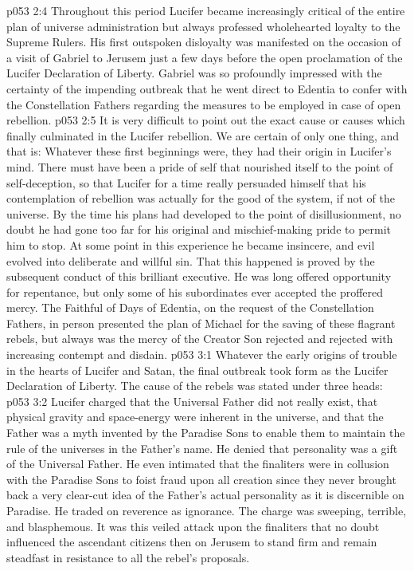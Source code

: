\vs p053 2:4 Throughout this period Lucifer became increasingly critical of the entire plan of universe administration but always professed wholehearted loyalty to the Supreme Rulers. His first outspoken disloyalty was manifested on the occasion of a visit of Gabriel to Jerusem just a few days before the open proclamation of the Lucifer Declaration of Liberty. Gabriel was so profoundly impressed with the certainty of the impending outbreak that he went direct to Edentia to confer with the Constellation Fathers regarding the measures to be employed in case of open rebellion.
\vs p053 2:5 It is very difficult to point out the exact cause or causes which finally culminated in the Lucifer rebellion. We are certain of only one thing, and that is: Whatever these first beginnings were, they had their origin in Lucifer’s mind. There must have been a pride of self that nourished itself to the point of self\hyp{}deception, so that Lucifer for a time really persuaded himself that his contemplation of rebellion was actually for the good of the system, if not of the universe. By the time his plans had developed to the point of disillusionment, no doubt he had gone too far for his original and mischief\hyp{}making pride to permit him to stop. At some point in this experience he became insincere, and evil evolved into deliberate and willful sin. That this happened is proved by the subsequent conduct of this brilliant executive. He was long offered opportunity for repentance, but only some of his subordinates ever accepted the proffered mercy. The Faithful of Days of Edentia, on the request of the Constellation Fathers, in person presented the plan of Michael for the saving of these flagrant rebels, but always was the mercy of the Creator Son rejected and rejected with increasing contempt and disdain.
\vs p053 3:1 Whatever the early origins of trouble in the hearts of Lucifer and Satan, the final outbreak took form as the Lucifer Declaration of Liberty. The cause of the rebels was stated under three heads:
\pc \vs p053 3:2 \bibnobreakspace {} Lucifer charged that the Universal Father did not really exist, that physical gravity and space\hyp{}energy were inherent in the universe, and that the Father was a myth invented by the Paradise Sons to enable them to maintain the rule of the universes in the Father’s name. He denied that personality was a gift of the Universal Father. He even intimated that the finaliters were in collusion with the Paradise Sons to foist fraud upon all creation since they never brought back a very clear\hyp{}cut idea of the Father’s actual personality as it is discernible on Paradise. He traded on reverence as ignorance. The charge was sweeping, terrible, and blasphemous. It was this veiled attack upon the finaliters that no doubt influenced the ascendant citizens then on Jerusem to stand firm and remain steadfast in resistance to all the rebel’s proposals.
